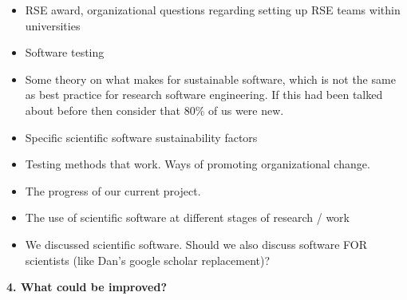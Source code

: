 \begin{itemize}
\item RSE award, organizational questions regarding setting up RSE teams within universities
\item Software testing
\item Some theory on what makes for sustainable software, which is not the same as best practice for research software engineering. If this had been talked about before then consider that 80\% of us were new.
\item Specific scientific software sustainability factors
\item Testing methods that work. Ways of promoting organizational change.
\item The progress of our current project.
\item The use of scientific software at different stages of research / work
\item We discussed scientific software. Should we also discuss software FOR scientists (like Dan's google scholar replacement)?
\end{itemize}

\noindent \textbf{4. What could be improved?}

